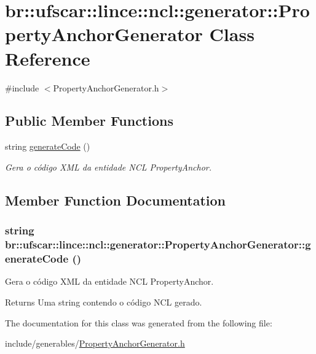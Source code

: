 \hypertarget{classbr_1_1ufscar_1_1lince_1_1ncl_1_1generator_1_1PropertyAnchorGenerator}{
\section{br::ufscar::lince::ncl::generator::PropertyAnchorGenerator Class Reference}
\label{classbr_1_1ufscar_1_1lince_1_1ncl_1_1generator_1_1PropertyAnchorGenerator}
}


{\ttfamily \#include $<$PropertyAnchorGenerator.h$>$}

\subsection*{Public Member Functions}
\begin{DoxyCompactItemize}
\item 
string \hyperlink{classbr_1_1ufscar_1_1lince_1_1ncl_1_1generator_1_1PropertyAnchorGenerator_a50eebba448e8a0d8850d486df617231a}{generateCode} ()
\begin{DoxyCompactList}\small\item\em Gera o código XML da entidade NCL PropertyAnchor. \item\end{DoxyCompactList}\end{DoxyCompactItemize}


\subsection{Member Function Documentation}
\hypertarget{classbr_1_1ufscar_1_1lince_1_1ncl_1_1generator_1_1PropertyAnchorGenerator_a50eebba448e8a0d8850d486df617231a}{
\subsubsection[{generateCode}]{\setlength{\rightskip}{0pt plus 5cm}string br::ufscar::lince::ncl::generator::PropertyAnchorGenerator::generateCode ()}}
\label{classbr_1_1ufscar_1_1lince_1_1ncl_1_1generator_1_1PropertyAnchorGenerator_a50eebba448e8a0d8850d486df617231a}


Gera o código XML da entidade NCL PropertyAnchor. 

\begin{DoxyReturn}{Returns}
Uma string contendo o código NCL gerado. 
\end{DoxyReturn}


The documentation for this class was generated from the following file:\begin{DoxyCompactItemize}
\item 
include/generables/\hyperlink{PropertyAnchorGenerator_8h}{PropertyAnchorGenerator.h}\end{DoxyCompactItemize}
